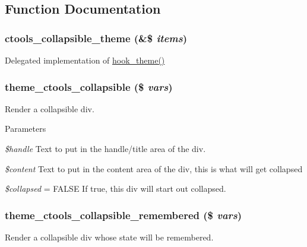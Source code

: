 \subsection{Function Documentation}
\hypertarget{collapsible_8theme_8inc_ac3cbe28b20673b0c4763aa08fcb4cdb5}{
\subsubsection[{ctools\_\-collapsible\_\-theme}]{\setlength{\rightskip}{0pt plus 5cm}ctools\_\-collapsible\_\-theme (\&\$ {\em items})}}
\label{collapsible_8theme_8inc_ac3cbe28b20673b0c4763aa08fcb4cdb5}
Delegated implementation of \hyperlink{group__hooks_ga013ccb45c7aaab1c16cf9691428c910d}{hook\_\-theme()} \hypertarget{collapsible_8theme_8inc_ac2cacb7cc31343e4d0f076ccea68996f}{
\subsubsection[{theme\_\-ctools\_\-collapsible}]{\setlength{\rightskip}{0pt plus 5cm}theme\_\-ctools\_\-collapsible (\$ {\em vars})}}
\label{collapsible_8theme_8inc_ac2cacb7cc31343e4d0f076ccea68996f}
Render a collapsible div.


\begin{DoxyParams}{Parameters}
\item[{\em \$handle}]Text to put in the handle/title area of the div. \item[{\em \$content}]Text to put in the content area of the div, this is what will get collapsed \item[{\em \$collapsed}]= FALSE If true, this div will start out collapsed. \end{DoxyParams}
\hypertarget{collapsible_8theme_8inc_af1a9535e3223701005bc7bbde65ba870}{
\subsubsection[{theme\_\-ctools\_\-collapsible\_\-remembered}]{\setlength{\rightskip}{0pt plus 5cm}theme\_\-ctools\_\-collapsible\_\-remembered (\$ {\em vars})}}
\label{collapsible_8theme_8inc_af1a9535e3223701005bc7bbde65ba870}
Render a collapsible div whose state will be remembered.


